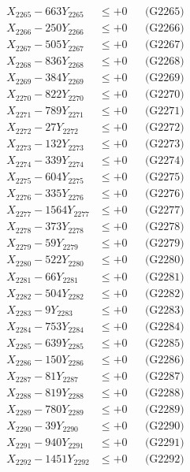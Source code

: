 \documentclass[a4paper,10pt]{article}
\begin{document}
{\begin{align}
X_{2265} - 663Y_{2265} &\leq +0 && \text{(G2265)} \\
X_{2266} - 250Y_{2266} &\leq +0 && \text{(G2266)} \\
X_{2267} - 505Y_{2267} &\leq +0 && \text{(G2267)} \\
X_{2268} - 836Y_{2268} &\leq +0 && \text{(G2268)} \\
X_{2269} - 384Y_{2269} &\leq +0 && \text{(G2269)} \\
X_{2270} - 822Y_{2270} &\leq +0 && \text{(G2270)} \\
\allowbreak
X_{2271} - 789Y_{2271} &\leq +0 && \text{(G2271)} \\
X_{2272} - 27Y_{2272} &\leq +0 && \text{(G2272)} \\
X_{2273} - 132Y_{2273} &\leq +0 && \text{(G2273)} \\
X_{2274} - 339Y_{2274} &\leq +0 && \text{(G2274)} \\
X_{2275} - 604Y_{2275} &\leq +0 && \text{(G2275)} \\
X_{2276} - 335Y_{2276} &\leq +0 && \text{(G2276)} \\
X_{2277} - 1564Y_{2277} &\leq +0 && \text{(G2277)} \\
X_{2278} - 373Y_{2278} &\leq +0 && \text{(G2278)} \\
X_{2279} - 59Y_{2279} &\leq +0 && \text{(G2279)} \\
X_{2280} - 522Y_{2280} &\leq +0 && \text{(G2280)} \\
\allowbreak
X_{2281} - 66Y_{2281} &\leq +0 && \text{(G2281)} \\
X_{2282} - 504Y_{2282} &\leq +0 && \text{(G2282)} \\
X_{2283} - 9Y_{2283} &\leq +0 && \text{(G2283)} \\
X_{2284} - 753Y_{2284} &\leq +0 && \text{(G2284)} \\
X_{2285} - 639Y_{2285} &\leq +0 && \text{(G2285)} \\
X_{2286} - 150Y_{2286} &\leq +0 && \text{(G2286)} \\
X_{2287} - 81Y_{2287} &\leq +0 && \text{(G2287)} \\
X_{2288} - 819Y_{2288} &\leq +0 && \text{(G2288)} \\
X_{2289} - 780Y_{2289} &\leq +0 && \text{(G2289)} \\
X_{2290} - 39Y_{2290} &\leq +0 && \text{(G2290)} \\
\allowbreak
X_{2291} - 940Y_{2291} &\leq +0 && \text{(G2291)} \\
X_{2292} - 1451Y_{2292} &\leq +0 && \text{(G2292)} \\

\end{align}}
\end{document}
